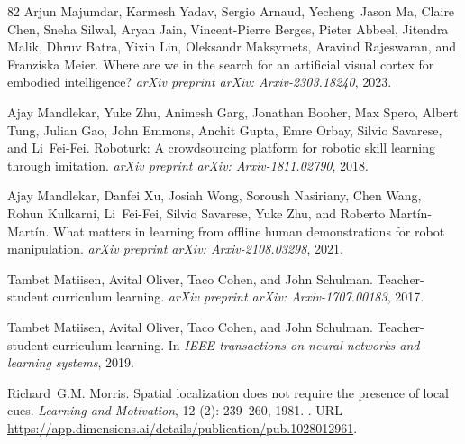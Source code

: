 \documentclass{article}
\begin{document}
\begin{thebibliography}{82}
Arjun Majumdar, Karmesh Yadav, Sergio Arnaud, Yecheng~Jason Ma, Claire Chen, Sneha Silwal, Aryan Jain, Vincent-Pierre Berges, Pieter Abbeel, Jitendra Malik, Dhruv Batra, Yixin Lin, Oleksandr Maksymets, Aravind Rajeswaran, and Franziska Meier.
\newblock Where are we in the search for an artificial visual cortex for embodied intelligence?
\newblock \emph{arXiv preprint arXiv: Arxiv-2303.18240}, 2023.

Ajay Mandlekar, Yuke Zhu, Animesh Garg, Jonathan Booher, Max Spero, Albert Tung, Julian Gao, John Emmons, Anchit Gupta, Emre Orbay, Silvio Savarese, and Li~Fei-Fei.
\newblock Roboturk: A crowdsourcing platform for robotic skill learning through imitation.
\newblock \emph{arXiv preprint arXiv: Arxiv-1811.02790}, 2018.

Ajay Mandlekar, Danfei Xu, Josiah Wong, Soroush Nasiriany, Chen Wang, Rohun Kulkarni, Li~Fei-Fei, Silvio Savarese, Yuke Zhu, and Roberto Martín-Martín.
\newblock What matters in learning from offline human demonstrations for robot manipulation.
\newblock \emph{arXiv preprint arXiv: Arxiv-2108.03298}, 2021.

Tambet Matiisen, Avital Oliver, Taco Cohen, and John Schulman.
\newblock Teacher-student curriculum learning.
\newblock \emph{arXiv preprint arXiv: Arxiv-1707.00183}, 2017.

Tambet Matiisen, Avital Oliver, Taco Cohen, and John Schulman.
\newblock Teacher-student curriculum learning.
\newblock In \emph{IEEE transactions on neural networks and learning systems}, 2019.

Richard~G.M. Morris.
\newblock Spatial localization does not require the presence of local cues.
\newblock \emph{Learning and Motivation}, 12 (2): 239--260, 1981.
\newblock {}.
\newblock URL \url{https://app.dimensions.ai/details/publication/pub.1028012961}.


\end{thebibliography}
\end{document}

